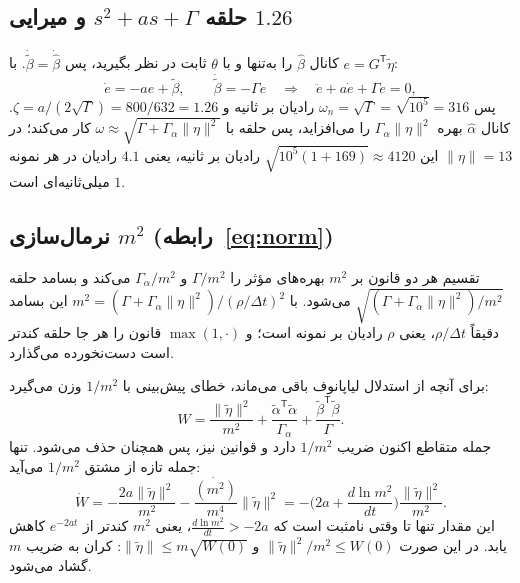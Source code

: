 \documentclass[10pt,twocolumn]{article}
\begin{document}
\subsection{حلقه $s^2+as+\Gamma$ و میرایی $1.26$}
کانال $\hat\beta$ را به‌تنها و با $\theta$ ثابت در نظر بگیرید، پس
$\dot{\tilde\beta}=\dot{\hat\beta}$. با $e=G^{\mathsf T}\tilde\eta$:
\begin{equation*}
    \dot e=-ae+\tilde\beta,\qquad \dot{\tilde\beta}=-\Gamma e
    \quad\Rightarrow\quad \ddot e+a\dot e+\Gamma e=0 ,
\end{equation*}
پس $\omega_n=\sqrt\Gamma=\sqrt{10^5}=316$ رادیان بر ثانیه و
$\zeta=a/(2\sqrt\Gamma)=800/632=1.26$. کانال $\hat\alpha$ بهره
$\Gamma_\alpha\|\eta\|^2$ را می‌افزاید، پس حلقه با
$\omega\approx\sqrt{\Gamma+\Gamma_\alpha\|\eta\|^2}$ کار می‌کند؛ در $\|\eta\|=13$ این
$\sqrt{10^5(1+169)}\approx4120$ رادیان بر ثانیه، یعنی $4.1$ رادیان در هر نمونه
$1$ میلی‌ثانیه‌ای است.

\subsection{نرمال‌سازی $m^2$ (رابطه~\eqref{eq:norm})}
تقسیم هر دو قانون بر $m^2$ بهره‌های مؤثر را $\Gamma/m^2$ و $\Gamma_\alpha/m^2$ می‌کند و
بسامد حلقه $\sqrt{(\Gamma+\Gamma_\alpha\|\eta\|^2)/m^2}$ می‌شود. با
$m^2=(\Gamma+\Gamma_\alpha\|\eta\|^2)/(\rho/\Delta t)^2$ این بسامد دقیقاً $\rho/\Delta t$،
یعنی $\rho$ رادیان بر نمونه است؛ و $\max(1,\cdot)$ قانون را هر جا حلقه کندتر است
دست‌نخورده می‌گذارد.

برای آنچه از استدلال لیاپانوف باقی می‌ماند، خطای پیش‌بینی با $1/m^2$ وزن می‌گیرد:
\begin{equation*}
    W=\frac{\|\tilde\eta\|^2}{m^2}+\frac{\tilde\alpha^{\mathsf T}\tilde\alpha}{\Gamma_\alpha}
    +\frac{\tilde\beta^{\mathsf T}\tilde\beta}{\Gamma}.
\end{equation*}
جمله متقاطع اکنون ضریب $1/m^2$ دارد و قوانین نیز، پس همچنان حذف می‌شود. تنها جمله
تازه از مشتق $1/m^2$ می‌آید:
\begin{equation*}
    \dot W=-\frac{2a\|\tilde\eta\|^2}{m^2}-\frac{\dot{(m^2)}}{m^4}\|\tilde\eta\|^2
    =-\Big(2a+\frac{d\ln m^2}{dt}\Big)\frac{\|\tilde\eta\|^2}{m^2}.
\end{equation*}
این مقدار تنها تا وقتی نامثبت است که $\frac{d\ln m^2}{dt}>-2a$، یعنی $m^2$ کندتر از
$e^{-2at}$ کاهش یابد. در این صورت $\|\tilde\eta\|^2/m^2\le W(0)$ و
$\|\tilde\eta\|\le m\sqrt{W(0)}$: کران به ضریب $m$ گشاد می‌شود.
\end{document}
